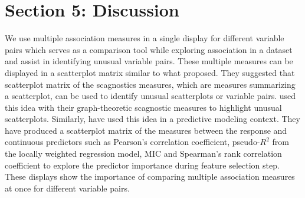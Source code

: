 \hypertarget{section-5-discussion}{%
\section{Section 5: Discussion}\label{section-5-discussion}}

We use multiple association measures in a single display for different
variable pairs which serves as a comparison tool while exploring
association in a dataset and assist in identifying unusual variable
pairs. These multiple measures can be displayed in a scatterplot matrix
similar to what \citet{tukey1985computer} proposed. They suggested that
scatterplot matrix of the scagnostics measures, which are measures
summarizing a scatterplot, can be used to identify unusual scatterplots
or variable pairs. \citet{wilkinson2005graph} used this idea with their
graph-theoretic scagnostic measures to highlight unusual scatterplots.
Similarly, \citet{kuhn2013applied} have used this idea in a predictive
modeling context. They have produced a scatterplot matrix of the
measures between the response and continuous predictors such as
Pearson's correlation coefficient, pseudo-\(R^2\) from the locally
weighted regression model, MIC and Spearman's rank correlation
coefficient to explore the predictor importance during feature selection
step. These displays show the importance of comparing multiple
association measures at once for different variable pairs.



\address{%
Amit Chinwan\\
Maynooth University\\%
Hamilton Institute\\ Maynooth, Ireland\\
%
%
%
\href{mailto:amit.chinwan.2019@mumail.ie}{\nolinkurl{amit.chinwan.2019@mumail.ie}}%
}

\address{%
Catherine Hurley\\
Maynooth University\\%
Department of Mathematics and Statistics\\ Maynooth, Ireland\\
%
%
%
\href{mailto:catherine.hurley@mu.ie}{\nolinkurl{catherine.hurley@mu.ie}}%
}
